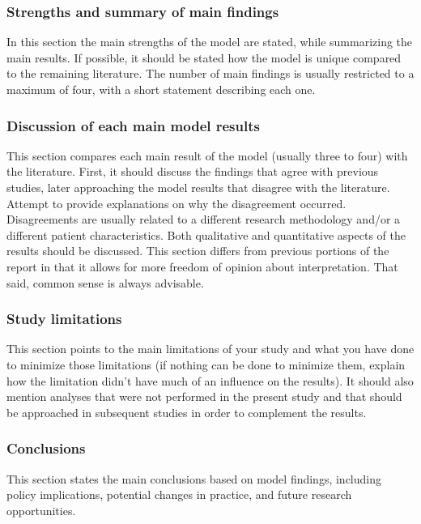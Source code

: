 \documentclass[11pt]{article}
\begin{document}
\subsubsection {Strengths and summary of main findings}
In this section the main strengths of the model are stated, while summarizing the main results. If possible, it should be stated how the model is unique compared to the remaining literature. The number of main findings is usually restricted to a maximum of four, with a short statement describing each one.

\subsubsection {Discussion of each main model results} 
This section compares each main result of the model (usually three to four) with the literature. First, it should discuss the findings that agree with previous studies, later approaching the model results that disagree with the literature. Attempt to provide explanations on why the disagreement occurred. Disagreements are usually related to a different research methodology and/or a different patient characteristics.  Both qualitative and quantitative aspects of the results should be discussed. This section differs from previous portions of the report in that it allows for more freedom of opinion about interpretation. That said, common sense is always advisable.

\subsubsection {Study limitations}
This section points to the main limitations of your study and what you have done to minimize those limitations (if nothing can be done to minimize them, explain how the limitation didn't have much of an influence on the results). It should also mention analyses that were not performed in the present study and that should be approached in subsequent studies in order to complement the results.

\subsubsection {Conclusions}
This section states the main conclusions based on model findings, including policy implications, potential changes in practice, and future research opportunities.
\end{document}
